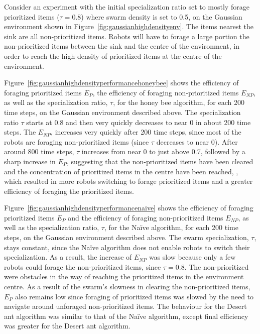 Consider an experiment with the initial specialization ratio set to mostly forage prioritized items ($\tau=0.8$) where swarm density is set to 0.5, on the Gaussian environment shown in Figure~\ref{fig:gaussianhighdensityenv}. The items nearest the sink are all non-prioritized items. Robots will have to forage a large portion the non-prioritized items between the sink and the centre of the environment, in order to reach the high density of prioritized items at the centre of the environment. 

Figure~\ref{fig:gaussianhighdensityperformancehoneybee} shows the efficiency of foraging prioritized items $E_P$, the efficiency of foraging non-prioritized items $E_{NP}$, as well as the specialization ratio, $\tau$, for the honey bee algorithm, for each 200 time steps, on the Gaussian environment described above. The specialization ratio $\tau$ starts at 0.8 and then very quickly decreases to near 0 in about 200 time steps. The $E_{NP}$, increases very quickly after 200 time steps, since most of the robots are foraging non-prioritized items (since $\tau$ decreases to near 0). After around 800 time steps, $\tau$ increases from near 0 to just above 0.7, followed by a sharp increase in $E_P$, suggesting that the non-prioritized items have been cleared and the concentration of prioritized items in the centre have been reached, , which resulted in more robots switching to forage prioritized items and a greater efficiency of foraging the prioritized items.

Figure~\ref{fig:gaussianhighdensityperformancenaive} shows the efficiency of foraging prioritized items $E_P$ and the efficiency of foraging non-prioritized items $E_{NP}$, as well as the specialization ratio, $\tau$, for the Na\"ive algorithm, for each 200 time steps, on the Gaussian environment described above. The swarm specialization, $\tau$, stays constant, since the Na\"ive algorithm does not enable robots to switch their specialization. As a result, the increase of $E_{NP}$ was slow because only a few robots could forage the non-prioritized items, since $\tau=0.8$. The non-prioritized were obstacles in the way of reaching the prioritized items in the environment centre. As a result of the swarm's slowness in clearing the non-prioritized items, $E_P$ also remains low since foraging of prioritized items was slowed by the need to navigate around unforaged non-prioritized items. The behaviour for the Desert ant algorithm was similar to that of the Na\"ive algorithm, except final efficiency was greater for the Desert ant algorithm.

